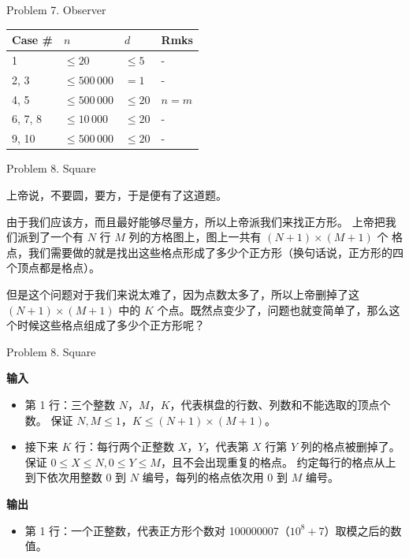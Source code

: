 \documentclass[UTF8]{beamer}
\begin{document}
\begin{frame}{Problem 7. Observer}

\begin{tabularx}{\textwidth}{X|X|X|X} \hline
Case \# & $n$ & $d$ & Rmks \\ \hline \hline
1       & $\leq 20$       & $\leq 5$  & - \\ \hline
2, 3    & $\leq 500\,000$ & $= 1$     & - \\ \hline
4, 5    & $\leq 500\,000$ & $\leq 20$ & $n = m$ \\ \hline
6, 7, 8 & $\leq 10\,000$  & $\leq 20$ & - \\ \hline
9, 10   & $\leq 500\,000$ & $\leq 20$ & - \\ \hline
\end{tabularx}

\end{frame}


\begin{frame}{Problem 8. Square}

上帝说，不要圆，要方，于是便有了这道题。

由于我们应该方，而且最好能够尽量方，所以上帝派我们来找正方形。
上帝把我们派到了一个有 $N$ 行 $M$ 列的方格图上，图上一共有 $(N + 1) \times (M + 1)$ 个
格点，我们需要做的就是找出这些格点形成了多少个正方形（换句话说，正方形的四个顶点都是格点）。

但是这个问题对于我们来说太难了，因为点数太多了，所以上帝删掉了这 $(N + 1) \times (M + 1)$
中的 $K$ 个点。既然点变少了，问题也就变简单了，那么这个时候这些格点组成了多少个正方形呢？

\end{frame}

\begin{frame}{Problem 8. Square}

\textbf{输入}
\begin{itemize}
    \item 第 1 行：三个整数 $N$，$M$，$K$，代表棋盘的行数、列数和不能选取的顶点个数。
                    保证 $N, M \leq 1$，$K \leq (N + 1) \times (M + 1)$。
    \item 接下来 $K$ 行：每行两个正整数 $X$，$Y$，代表第 $X$ 行第 $Y$ 列的格点被删掉了。
                    保证 $0 \leq X \leq N, 0 \leq Y \leq M$，且不会出现重复的格点。
                    约定每行的格点从上到下依次用整数 0 到 $N$ 编号，每列的格点依次用 0 到 $M$ 编号。
\end{itemize}
\textbf{输出}
\begin{itemize}
    \item 第 1 行：一个正整数，代表正方形个数对 100000007（$10^8 + 7$）取模之后的数值。
\end{itemize}

\end{frame}
\end{document}
